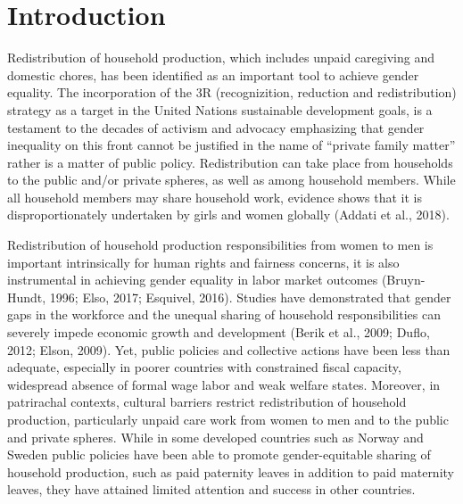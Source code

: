 \documentclass[
  11pt,
]{article}
\begin{document}
\thispagestyle{empty}
\clearpage{}
\newpage
{} %
\section{Introduction}\label{introduction}

Redistribution of household production, which includes unpaid caregiving
and domestic chores, has been identified as an important tool to achieve
gender equality. The incorporation of the 3R (recognizition, reduction
and redistribution) strategy as a target in the United Nations
sustainable development goals, is a testament to the decades of activism
and advocacy emphasizing that gender inequality on this front cannot be
justified in the name of ``private family matter'' rather is a matter of
public policy. Redistribution can take place from households to the
public and/or private spheres, as well as among household members. While
all household members may share household work, evidence shows that it
is disproportionately undertaken by girls and women globally (Addati et
al., 2018).

Redistribution of household production responsibilities from women to
men is important intrinsically for human rights and fairness concerns,
it is also instrumental in achieving gender equality in labor market
outcomes (Bruyn-Hundt, 1996; Elso, 2017; Esquivel, 2016). Studies have
demonstrated that gender gaps in the workforce and the unequal sharing
of household responsibilities can severely impede economic growth and
development (Berik et al., 2009; Duflo, 2012; Elson, 2009). Yet, public
policies and collective actions have been less than adequate, especially
in poorer countries with constrained fiscal capacity, widespread absence
of formal wage labor and weak welfare states. Moreover, in patrirachal
contexts, cultural barriers restrict redistribution of household
production, particularly unpaid care work from women to men and to the
public and private spheres. While in some developed countries such as
Norway and Sweden public policies have been able to promote
gender-equitable sharing of household production, such as paid paternity
leaves in addition to paid maternity leaves, they have attained limited
attention and success in other countries.
\end{document}
